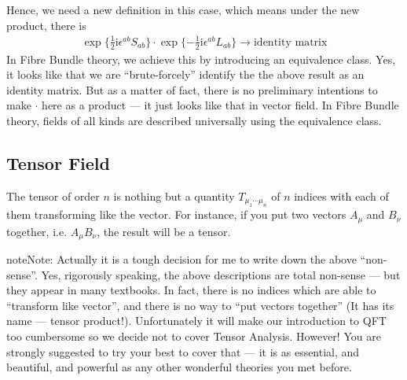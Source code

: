 \documentclass[letterpaper,10pt,english]{sphinxmanual}
\begin{document}
Hence, we need a new definition in this case, which means under the new product, there is
\begin{equation*}
\begin{split}\exp\{\frac{1}{2}\mathrm{i}\epsilon^{ab}S_{ab}\} \cdot \exp\{-\frac{1}{2}\mathrm{i}\epsilon^{ab}L_{ab}\} \rightarrow \text{identity matrix}\end{split}
\end{equation*}
In Fibre Bundle theory, we achieve this by introducing an equivalence class. Yes, it looks like that we are ``brute-forcely'' identify the the above result as an identity matrix. But as a matter of fact, there is no preliminary intentions to make \(\cdot\) here as a product --- it just looks like that in vector field. In Fibre Bundle theory, fields of all kinds are described universally using the equivalence class.


\subsection{Tensor Field}
\label{\detokenize{field:tensor-field}}
The tensor of order \(n\) is nothing but a quantity \(T_{\mu_1\cdots \mu_n}\) of \(n\) indices with each of them transforming like the vector. For instance, if you put two vectors \(A_\mu\) and \(B_\nu\) together, i.e. \(A_\mu B_\nu\), the result will be a tensor.

\begin{sphinxadmonition}{note}{Note:}
Actually it is a tough decision for me to write down the above ``non-sense''. Yes, rigorously speaking, the above descriptions are total non-sense --- but they appear in many textbooks. In fact, there is no indices which are able to ``transform like vector'', and there is no way to ``put vectors together'' (It has its name --- tensor product!). Unfortunately it will make our introduction to QFT too cumbersome so we decide not to cover Tensor Analysis. However! You are strongly suggested to try your best to cover that --- it is as essential, and beautiful, and powerful as any other wonderful theories you met before.
\end{sphinxadmonition}
\end{document}
